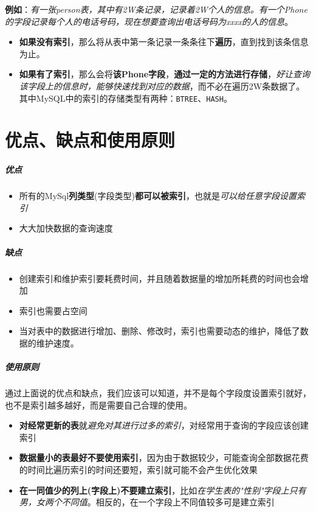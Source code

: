 \documentclass[UTF8,a4paper,12pt]{ctexbook}
\begin{document}
		\textbf{例如}：\textit{有一张person表，其中有2W条记录，记录着2W个人的信息。有一个Phone的字段记录每个人的电话号码，现在想要查询出电话号码为xxxx的人的信息}。
			\begin{itemize}
				\item \textbf{如果没有索引}，那么将从表中第一条记录一条条往下\textbf{遍历}，直到找到该条信息为止。
				\item \textbf{如果有了索引}，那么会将\textbf{该Phone字段}，\textbf{通过一定的方法进行存储}，\textit{好让查询该字段上的信息时，能够快速找到对应的数据}，而不必在遍历2W条数据了。其中MySQL中的索引的存储类型有两种：\verb|BTREE|、\verb|HASH|。
			\end{itemize}

	\section{优点、缺点和使用原则}
		\subparagraph{优点}
			\begin{itemize}[itemindent = 2em]
				\item 所有的MySql\textbf{列类型}(字段类型)\textbf{都可以被索引}，也就是\textit{可以给任意字段设置索引}
				\item 大大加快数据的查询速度
			\end{itemize}
			
		\subparagraph{缺点}
			\begin{itemize}[itemindent = 2em]
				\item 创建索引和维护索引要耗费时间，并且随着数据量的增加所耗费的时间也会增加
				\item 索引也需要占空间
				\item 当对表中的数据进行增加、删除、修改时，索引也需要动态的维护，降低了数据的维护速度。
			\end{itemize}
			
		\subparagraph{使用原则}
			通过上面说的优点和缺点，我们应该可以知道，并不是每个字段度设置索引就好，也不是索引越多越好，而是需要自己合理的使用。
			\begin{itemize}[itemindent = 2em]
				\item \textbf{对经常更新的表}就\textit{避免对其进行过多的索引}，对经常用于查询的字段应该创建索引
				\item \textbf{数据量小的表最好不要使用索引}，因为由于数据较少，可能查询全部数据花费的时间比遍历索引的时间还要短，索引就可能不会产生优化效果
				\item \textbf{在一同值少的列上(字段上)不要建立索引}，比如\textit{在学生表的"性别"字段上只有男，女两个不同值}。相反的，在一个字段上不同值较多可是建立索引
			\end{itemize}
			
\end{document}
